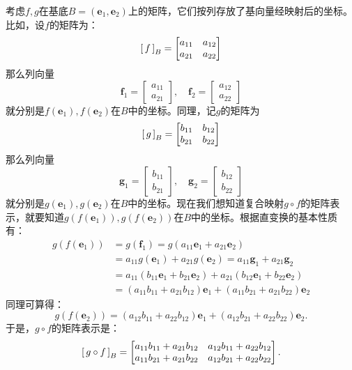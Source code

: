 \documentclass[12pt,UTF8]{ctexbook}
\begin{document}
考虑$f,g$在基底$B = (\mathbf{e}_1,\mathbf{e}_2)$上的矩阵，它们按列存放了基向量经映射后的坐标。比如，设$f$的矩阵为： 
$$
    \bmat{f}[B] = 
    \begin{bmatrix}
        a_{11} & a_{12} \\ a_{21} & a_{22}
    \end{bmatrix}
$$
那么列向量
$$
    \mathbf{f}_1 = \begin{bmatrix}
        a_{11} \\ a_{21} 
    \end{bmatrix},\quad
    \mathbf{f}_2 = \begin{bmatrix}
        a_{12} \\ a_{22}
    \end{bmatrix}
$$
就分别是$f(\mathbf{e}_1),f(\mathbf{e}_2)$在$B$中的坐标。同理，记$g$的矩阵为
$$
    \bmat{g}[B] = 
    \begin{bmatrix}
        b_{11} & b_{12} \\ b_{21} & b_{22}
    \end{bmatrix}
$$
那么列向量
$$
    \mathbf{g}_1 = \begin{bmatrix}
        b_{11} \\ b_{21} 
    \end{bmatrix},\quad
    \mathbf{g}_2 = \begin{bmatrix}
        b_{12} \\ b_{22}
    \end{bmatrix}
$$
就分别是$g(\mathbf{e}_1),g(\mathbf{e}_2)$在$B$中的坐标。现在我们想知道复合映射$g\circ f$的矩阵表示，就要知道$g(f(\mathbf{e}_1)),g(f(\mathbf{e}_2))$在$B$中的坐标。根据直变换的基本性质有：
\begin{align*}
    g(f(\mathbf{e}_1)) &= g(\mathbf{f}_1) = g(a_{11}\mathbf{e}_1 + a_{21}\mathbf{e}_2)\\
    &= a_{11}g(\mathbf{e}_1) + a_{21}g(\mathbf{e}_2) = a_{11} \mathbf{g}_1 + a_{21}\mathbf{g}_2 \\
    &= a_{11}(b_{11}\mathbf{e}_1 + b_{21}\mathbf{e}_2) + a_{21}(b_{12}\mathbf{e}_1 + b_{22}\mathbf{e}_2) \\
    &= (a_{11}b_{11} + a_{21}b_{12})\mathbf{e}_1 + (a_{11}b_{21} + a_{21}b_{22})\mathbf{e}_2
\end{align*}
同理可算得：
$$
g(f(\mathbf{e}_2)) = (a_{12}b_{11} + a_{22}b_{12})\mathbf{e}_1 + (a_{12}b_{21} + a_{22}b_{22})\mathbf{e}_2.
$$
于是，$g\circ f$的矩阵表示是：
$$
    \bmat{g\circ f}[B] = 
    \begin{bmatrix}
        a_{11}b_{11} + a_{21}b_{12} & a_{12}b_{11} + a_{22}b_{12} \\ a_{11}b_{21} + a_{21}b_{22} & a_{12}b_{21} + a_{22}b_{22}
    \end{bmatrix}.
$$
\end{document}
